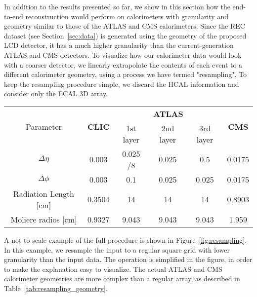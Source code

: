 In addition to the results presented so far, we show in this section how the end-to-end reconstruction would perform on calorimeters with granularity and geometry similar to those of the ATLAS and CMS calorimeters. Since the REC dataset (see Section~\ref{sec:data}) is generated using the geometry of the proposed LCD detector, it has a much higher granularity than the current-generation ATLAS and CMS detectors. To visualize how our calorimeter data would look with a coarser detector, we linearly extrapolate the contents of each event to a different calorimeter geometry, using a process we have termed "resampling". To keep the resampling procedure simple, we discard the HCAL information and consider only the ECAL 3D array.

\begin{table*}[tbp]
\centering
\caption{Detailed description of the three detector geometries used in this study: the baseline CLIC ECAL detector and the ATLAS and CMS calorimeters.\label{tab:resampling_geometry}}
\begin{tabular}{c|c|ccc|c}
\hline
\multirow{2}{*}{Parameter} & \multirow{2}{*}{\textbf{CLIC}} & \multicolumn{3}{c|}{\textbf{ATLAS}} & \multirow{2}{*}{\textbf{CMS}} \\
            &               & 1st layer & 2nd layer & 3rd layer & \\
\hline
$\Delta \eta$         & 0.003  & 0.025 /8 & 0.025 & 0.5   & 0.0175 \\
$\Delta \phi$         & 0.003  & 0.1      & 0.025 & 0.025 & 0.0175 \\
Radiation Length [cm] & 0.3504 & 14       & 14    & 14    & 0.8903 \\
Moliere radios [cm]   & 0.9327 & 9.043    & 9.043 & 9.043 & 1.959  \\
\hline 
\end{tabular}
\end{table*}

A not-to-scale example of the full procedure is shown in Figure~\ref{fig:resampling}. In this example, we resample the input to a regular square grid with lower granularity than the input data. The operation is simplified in the figure, in order to make the explanation easy to visualize. The actual ATLAS and CMS calorimeter geometries are more complex than a regular array, as described in Table~\ref{tab:resampling_geometry}.

